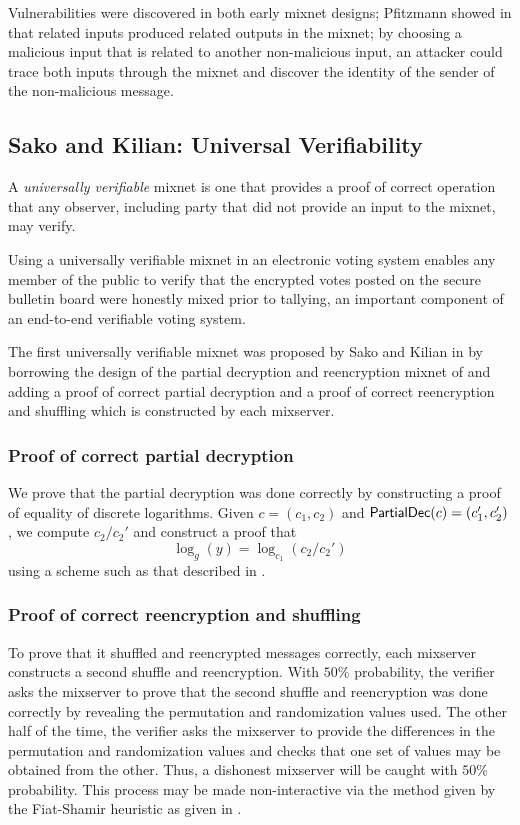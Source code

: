Vulnerabilities were discovered in both early mixnet designs; Pfitzmann showed in \cite{pfitzmann90, pfitzmann95} that related inputs produced related outputs in the mixnet; by choosing a malicious input that is related to another non-malicious input, an attacker could trace both inputs through the mixnet and discover the identity of the sender of the non-malicious message.

\subsection{Sako and Kilian: Universal Verifiability}

\begin{definition}
A \emph{universally verifiable} mixnet is one that provides a proof of correct operation that any observer, including party that did not provide an input to the mixnet, may verify.
\end{definition}

Using a universally verifiable mixnet in an electronic voting system enables any member of the public to verify that the encrypted votes posted on the secure bulletin board were honestly mixed prior to tallying, an important component of an end-to-end verifiable voting system.

The first universally verifiable mixnet was proposed by Sako and Kilian in \cite{sako95} by borrowing the design of the partial decryption and reencryption mixnet of \cite{park94} and adding a proof of correct partial decryption and a proof of correct reencryption and shuffling which is constructed by each mixserver.

\subsubsection{Proof of correct partial decryption}

We prove that the partial decryption was done correctly by constructing a proof of equality of discrete logarithms. Given $c = (c_1, c_2)$ and $\operatorname{\mathsf{PartialDec}}(c) = (c_1', c_2')$, we compute $c_2 / c_2'$ and construct a proof that
$$\log_{g}(y) = \log_{c_1}(c_2 / c_2')$$
using a scheme such as that described in \cite{chaum-pedersen}.

\subsubsection{Proof of correct reencryption and shuffling}

To prove that it shuffled and reencrypted messages correctly, each mixserver constructs a second shuffle and reencryption. With $50\%$ probability, the verifier asks the mixserver to prove that the second shuffle and reencryption was done correctly by revealing the permutation and randomization values used. The other half of the time, the verifier asks the mixserver to provide the differences in the permutation and randomization values and checks that one set of values may be obtained from the other. Thus, a dishonest mixserver will be caught with $50\%$ probability. This process may be made non-interactive via the method given by the Fiat-Shamir heuristic as given in \cite{fiat-shamir}.

